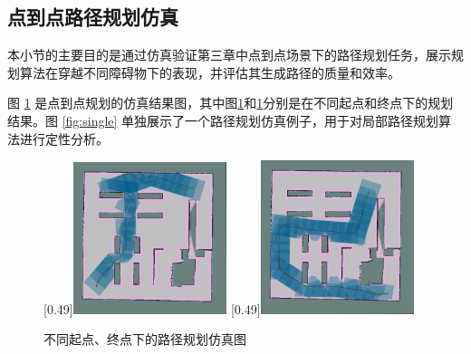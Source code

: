 \documentclass[master,academic]{ysuthesis} %
\begin{document}
		\subsection{点到点路径规划仿真}
		本小节的主要目的是通过仿真验证第三章中点到点场景下的路径规划任务，展示规划算法在穿越不同障碍物下的表现，并评估其生成路径的质量和效率。
		
		图 \ref{fig:点到点路径规划仿真案例} 是点到点规划的仿真结果图，其中图\ref{fig:点到点路径规划仿真案例}和\ref{fig:点到点路径规划仿真案例}分别是在不同起点和终点下的规划结果。图 \ref{fig:single} 单独展示了一个路径规划仿真例子，用于对局部路径规划算法进行定性分析。

		\newpage
		\vspace*{-1.5em}

		\begin{figure}[H]
			\centering
			[0.49\textwidth]{\includegraphics[width=0.4\textwidth]{single_3.png}}
			[0.49\textwidth]{\includegraphics[width=0.4\textwidth]{single_4.png}}
			\caption{不同起点、终点下的路径规划仿真图}
			\label{fig:点到点路径规划仿真案例}
		\end{figure}
\end{document}
